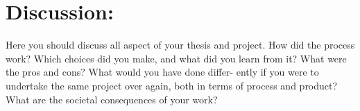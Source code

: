 \chapter{Discussion:}

Here you should discuss all aspect of your thesis and project. How did the process work? Which choices did you make, and what did you learn from it? What were the pros and cons? What would you have done differ- ently if you were to undertake the same project over again, both in terms of process and product? What are the societal consequences of your work?